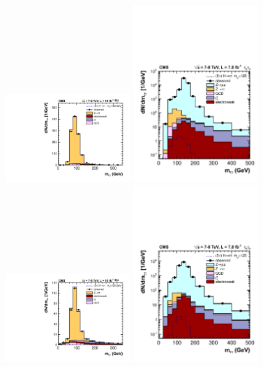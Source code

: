 \documentclass[11pt,twoside,a4paper,cmspaper,final,collab]{cms-tdr}
\begin{document}
\begin{figure}[htbp]
\begin{center}
\includegraphics[width=0.42\textwidth]{figures/htt/emu_0jet_rescaled_7and8TeV.pdf}
\includegraphics[width=0.42\textwidth]{figures/htt/mumu_rescaled_0jet_LOG.pdf} \\
\includegraphics[width=0.42\textwidth]{figures/htt/emu_boost_rescaled_7and8TeV.pdf}
\includegraphics[width=0.42\textwidth]{figures/htt/mumu_rescaled_1jet_LOG.pdf} \\

\end{center}
\end{figure}
\end{document}
